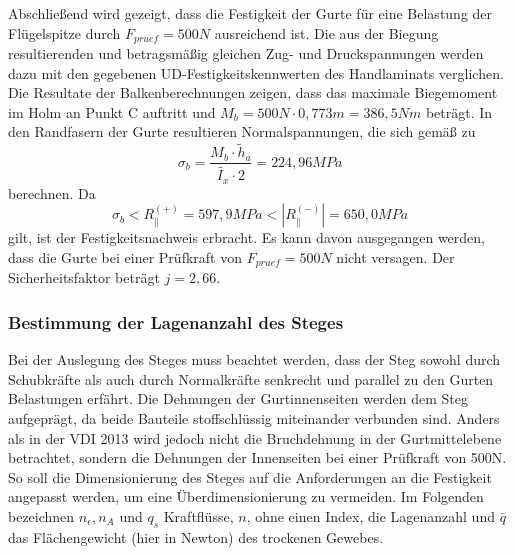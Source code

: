 \noindent Abschließend wird gezeigt, dass die Festigkeit der Gurte für eine Belastung der Flügelspitze durch $ F_{pruef}=500N $ ausreichend ist. Die aus der Biegung resultierenden und betragsmäßig gleichen Zug- und Druckspannungen werden dazu mit den gegebenen UD-Festigkeitskennwerten des Handlaminats verglichen. Die Resultate der Balkenberechnungen zeigen, dass das maximale Biegemoment im Holm an Punkt C auftritt und $ M_{b}=500N\cdot 0,773m=386,5Nm $ beträgt. In den Randfasern der Gurte resultieren Normalspannungen, die sich gemäß \cite{item15} zu\\
\begin{equation}
	\sigma_{b}=\frac{M_{b}\cdot \tilde{h}_{a}}{\tilde{I_{x}}\cdot 2}=224,96MPa
\end{equation} 
berechnen. Da 
\begin{equation}
	\sigma_{b}< R^{(+)}_{\|}=597,9 MPa < |R^{(-)}_{\|}| =650,0 MPa
\end{equation} 
gilt, ist der Festigkeitsnachweis erbracht. Es kann davon ausgegangen werden, dass die Gurte bei einer Prüfkraft von $ F_{pruef}=500N $ nicht versagen. Der Sicherheitsfaktor beträgt $ j=2,66 $. \\

\subsubsection{Bestimmung der Lagenanzahl des Steges}\label{LagenSteg}
Bei der Auslegung des Steges muss beachtet werden, dass der Steg sowohl durch Schubkräfte als auch durch Normalkräfte senkrecht und parallel zu den Gurten Belastungen erfährt. Die Dehnungen der Gurtinnenseiten werden dem Steg aufgeprägt, da beide Bauteile stoffschlüssig miteinander verbunden sind. Anders als in der VDI 2013 wird jedoch nicht die Bruchdehnung in der Gurtmittelebene betrachtet, sondern die Dehnungen der Innenseiten bei einer Prüfkraft von 500N. So soll die Dimensionierung des Steges auf die Anforderungen an die Festigkeit angepasst werden, um eine Überdimensionierung zu vermeiden. Im Folgenden bezeichnen $ n_{\epsilon}, n_{A} $ und $ q_{s} $ Kraftflüsse, $ n $, ohne einen Index, die Lagenanzahl und $ \bar{q} $ das Flächengewicht (hier in Newton) des trockenen Gewebes.\\

